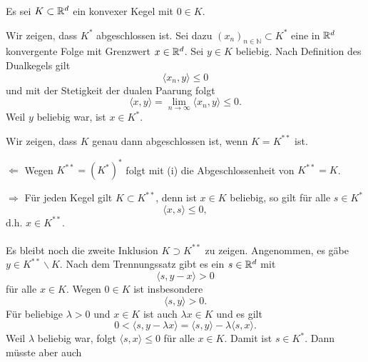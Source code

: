 
Es sei $K\subset \mathbb{R}^d$ ein konvexer Kegel mit $0\in K$.
\\
\begin{compactenum}[(i)]
 \item Wir zeigen, dass $K^*$ abgeschlossen ist. Sei dazu $(x_n)_{n\in\mathbb N}\subset K^*$ eine in $\mathbb{R}^d$ konvergente Folge mit Grenzwert $x\in\mathbb{R}^d$. Sei $y\in K$ beliebig. Nach Definition des Dualkegels gilt 
 \begin{displaymath}
  \langle x_n,y\rangle\leq 0
 \end{displaymath}
 und mit der Stetigkeit der dualen Paarung folgt
 \begin{displaymath}
  \langle x, y\rangle =\lim_{n\to\infty}\langle x_n,y\rangle\leq 0.
 \end{displaymath} 
 Weil $y$ beliebig war, ist $x\in K^*$.
 \\
 \item Wir zeigen, dass $K$ genau dann abgeschlossen ist, wenn $K=K^{**}$ ist.
 \begin{compactenum}
 \item[$\Leftarrow$] Wegen $K^{**}=(K^*)^*$ folgt mit (i) die Abgeschlossenheit von $K^{**}=K$.
 \item[$\Rightarrow$] Für jeden Kegel gilt $K\subset K^{**}$, denn ist $x\in K$ beliebig,
 so gilt für alle $s\in K^*$
 \begin{displaymath}
    \langle x,s\rangle\leq 0,
 \end{displaymath}
 d.h. $x\in K^{**}$.\\\\
Es bleibt noch die zweite Inklusion $K\supset K^{**}$ zu zeigen. Angenommen, es gäbe
 $y\in K^{**}\backslash K$. Nach dem Trennungssatz gibt es ein $s\in \mathbb{R}^d$ mit 
 \begin{displaymath}
  \langle s, y-x\rangle > 0
 \end{displaymath}
 für alle $x\in K$. Wegen $0\in K$ ist insbesondere
 \begin{displaymath}
  \langle s,y\rangle >0.
 \end{displaymath}
Für beliebige $\lambda>0$ und $x\in K$ ist auch $\lambda x\in K$ und es gilt 
 \begin{displaymath}
  0<\langle s, y-\lambda x\rangle=\langle s, y\rangle-\lambda\langle s, x\rangle.
 \end{displaymath}
 Weil $\lambda$ beliebig war, folgt $\langle s, x\rangle\leq 0$ für alle $x\in K$. 
 Damit ist $s\in K^*$. Dann müsste aber auch
 \begin{displaymath}

\end{displaymath}
\end{compactenum}
\end{compactenum}
